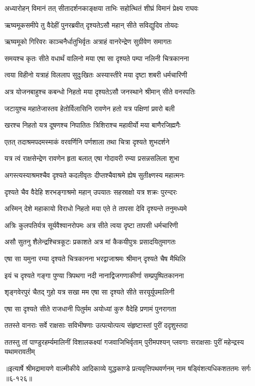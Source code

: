 \twolineshloka
{अध्यारोहन् विमानं तत् सीतादर्शनकाङ्क्षया}
{ताभिः सहोत्थितं शीघ्रं विमानं प्रेक्ष्य राघवः} %

\twolineshloka
{ऋष्यमूकसमीपे तु वैदेहीं पुनरब्रवीत्}
{दृश्यतेऽसौ महान् सीते सविद्युदिव तोयदः} %

\twolineshloka
{ऋष्यमूको गिरिवरः काञ्चनैर्धातुभिर्वृतः}
{अत्राहं वानरेन्द्रेण सुग्रीवेण समागतः} %

\twolineshloka
{समयश्च कृतः सीते वधार्थं वालिनो मया}
{एषा सा दृश्यते पम्पा नलिनी चित्रकानना} %

\twolineshloka
{त्वया विहीनो यत्राहं विललाप सुदुःखितः}
{अस्यास्तीरे मया दृष्टा शबरी धर्मचारिणी} %

\twolineshloka
{अत्र योजनबाहुश्च कबन्धो निहतो मया}
{दृश्यतेऽसौ जनस्थाने श्रीमान् सीते वनस्पतिः} %

\twolineshloka
{जटायुश्च महातेजास्तव हेतोर्विलासिनि}
{रावणेन हतो यत्र पक्षिणां प्रवरो बली} %

\twolineshloka
{खरश्च निहतो यत्र दूषणश्च निपातितः}
{त्रिशिराश्च महावीर्यो मया बाणैरजिह्मगैः} %

\twolineshloka
{एतत् तदाश्रमपदमस्माकं वरवर्णिनि}
{पर्णशाला तथा चित्रा दृश्यते शुभदर्शने} %

\twolineshloka
{यत्र त्वं राक्षसेन्द्रेण रावणेन हृता बलात्}
{एषा गोदावरी रम्या प्रसन्नसलिला शुभा} %

\twolineshloka
{अगस्त्यस्याश्रमश्चैव दृश्यते कदलीवृतः}
{दीप्तश्चैवाश्रमे ह्येष सुतीक्ष्णस्य महात्मनः} %

\twolineshloka
{दृश्यते चैव वैदेहि शरभङ्गाश्रमो महान्}
{उपयातः सहस्राक्षो यत्र शक्रः पुरन्दरः} %

\twolineshloka
{अस्मिन् देशे महाकायो विराधो निहतो मया}
{एते ते तापसा देवि दृश्यन्ते तनुमध्यमे} %

\twolineshloka
{अत्रिः कुलपतिर्यत्र सूर्यवैश्वानरोपमः}
{अत्र सीते त्वया दृष्टा तापसी धर्मचारिणी} %

\twolineshloka
{असौ सुतनु शैलेन्द्रश्चित्रकूटः प्रकाशते}
{अत्र मां कैकयीपुत्रः प्रसादयितुमागतः} %

\twolineshloka
{एषा सा यमुना रम्या दृश्यते चित्रकानना}
{भरद्वाजाश्रमः श्रीमान् दृश्यते चैष मैथिलि} %

\twolineshloka
{इयं च दृश्यते गङ्गा पुण्या त्रिपथगा नदी}
{नानाद्विजगणाकीर्णा सम्प्रपुष्पितकानना} %

\twolineshloka
{शृङ्गवेरपुरं चैतद् गुहो यत्र सखा मम}
{एषा सा दृश्यते सीते सरयूर्यूपमालिनी} %

\twolineshloka
{एषा सा दृश्यते सीते राजधानी पितुर्मम}
{अयोध्यां कुरु वैदेहि प्रणामं पुनरागता} %

\twolineshloka
{ततस्ते वानराः सर्वे राक्षसाः सविभीषणाः}
{उत्पत्योत्पत्य संहृष्टास्तां पुरीं ददृशुस्तदा} %

\twolineshloka
{ततस्तु तां पाण्डुरहर्म्यमालिनीं विशालकक्ष्यां गजवाजिभिर्वृताम्}
{पुरीमपश्यन् प्लवगाः सराक्षसाः पुरीं महेन्द्रस्य यथामरावतीम्} %


॥इत्यार्षे श्रीमद्रामायणे वाल्मीकीये आदिकाव्ये युद्धकाण्डे प्रत्यवृत्तिपथवर्णनम् नाम षड्विंशत्यधिकशततमः सर्गः ॥६-१२६॥

